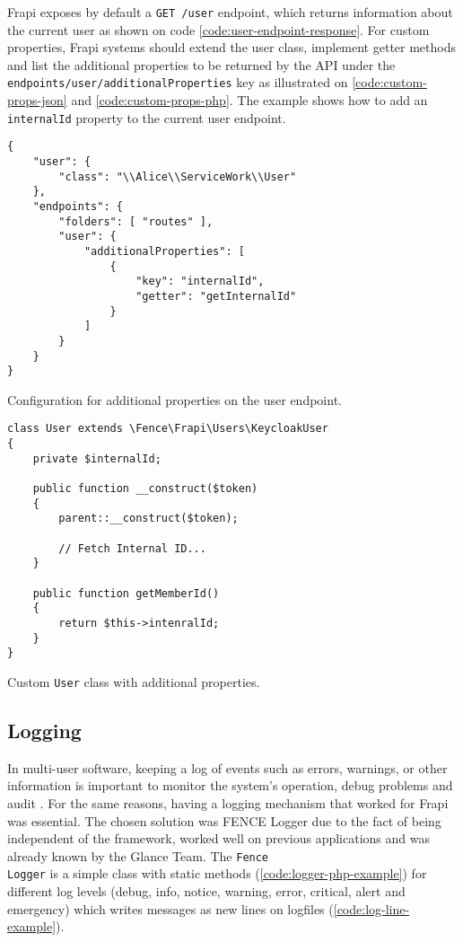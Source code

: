 Frapi exposes by default a \texttt{GET /user} endpoint, which returns information about the current user as shown on code \autoref{code:user-endpoint-response}. For custom properties, Frapi systems should extend the user class, implement getter methods and list the additional properties to be returned by the API under the \texttt{endpoints/user/additionalProperties} key as illustrated on \autoref{code:custom-props-json} and \autoref{code:custom-props-php}. The example shows how to add an \texttt{internalId} property to the current user endpoint.

\begin{listing}[htbp]
\begin{verbatim}
{
    "user": {
        "class": "\\Alice\\ServiceWork\\User"
    },
    "endpoints": {
        "folders": [ "routes" ],
        "user": {
            "additionalProperties": [
                {
                    "key": "internalId",
                    "getter": "getInternalId"
                }
            ]
        }
    }
}
\end{verbatim}
\caption{Configuration for additional properties on the user endpoint.}
\label{code:custom-props-json}
\end{listing}

\begin{listing}[htbp]
\begin{verbatim}
class User extends \Fence\Frapi\Users\KeycloakUser
{
	private $internalId;

	public function __construct($token)
	{
		parent::__construct($token);
		
		// Fetch Internal ID...
	}

    public function getMemberId()
    {
        return $this->intenralId;
    }
}
\end{verbatim}
\caption{Custom \texttt{User} class with additional properties.}
\label{code:custom-props-php}
\end{listing}

\subsection{Logging}

In multi-user software, keeping a log of events such as errors, warnings, or other information is important to monitor the system's operation, debug problems and audit \cite{logging-wikipedia}. For the same reasons, having a logging mechanism that worked for Frapi was essential. The chosen solution was FENCE Logger due to the fact of being independent of the framework, worked well on previous applications and was already known by the Glance Team. The \texttt{Fence\\Logger} is a simple class with static methods (\autoref{code:logger-php-example}) for different log levels (debug, info, notice, warning, error, critical, alert and emergency) which writes messages as new lines on logfiles (\autoref{code:log-line-example}).

